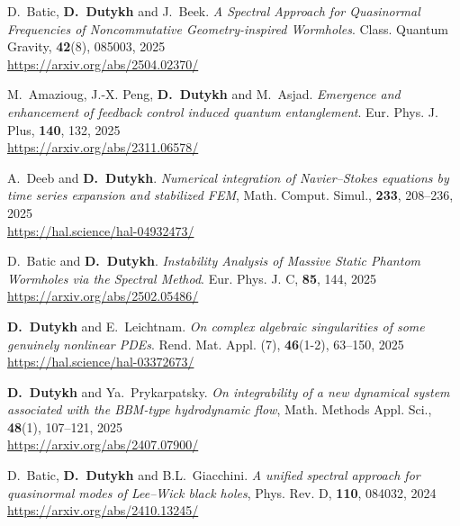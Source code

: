 \begin{etaremune}
  \item D.~Batic, \textbf{D.~Dutykh} and J.~Beek. \textit{A Spectral Approach for Quasinormal Frequencies of Noncommutative Geometry-inspired Wormholes}. Class. Quantum Gravity, \textbf{42}(8), 085003, 2025 \\ %
  \url{https://arxiv.org/abs/2504.02370/}

  \item M.~Amazioug, J.-X. Peng, \textbf{D.~Dutykh} and M.~Asjad. \textit{Emergence and enhancement of feedback control induced quantum entanglement}. Eur. Phys. J. Plus, \textbf{140}, 132, 2025 \\ %
  \url{https://arxiv.org/abs/2311.06578/}

  \item A.~Deeb and \textbf{D.~Dutykh}. \textit{Numerical integration of Navier--Stokes equations by time series expansion and stabilized FEM}, Math. Comput. Simul., \textbf{233}, 208--236, 2025 \\ %
  \url{https://hal.science/hal-04932473/}

  \item D.~Batic and \textbf{D.~Dutykh}. \textit{Instability Analysis of Massive Static Phantom Wormholes via the Spectral Method}. Eur. Phys. J. C, \textbf{85}, 144, 2025 \\ %
  \url{https://arxiv.org/abs/2502.05486/}

  \item \textbf{D.~Dutykh} and E.~Leichtnam. \textit{On complex algebraic singularities of some genuinely nonlinear PDEs}. Rend. Mat. Appl. (7), \textbf{46}(1-2), 63--150, 2025 \\ %
  \url{https://hal.science/hal-03372673/}

  \item \textbf{D.~Dutykh} and Ya.~Prykarpatsky. \textit{On integrability of a new dynamical system associated with the BBM-type hydrodynamic flow}, Math. Methods Appl. Sci., \textbf{48}(1), 107--121, 2025 \\ %
  \url{https://arxiv.org/abs/2407.07900/}



  \item D.~Batic, \textbf{D.~Dutykh} and B.L.~Giacchini. \textit{A unified spectral approach for quasinormal modes of Lee--Wick black holes}, Phys. Rev. D, \textbf{110}, 084032, 2024 \\ %
  \url{https://arxiv.org/abs/2410.13245/}


\end{etaremune}

